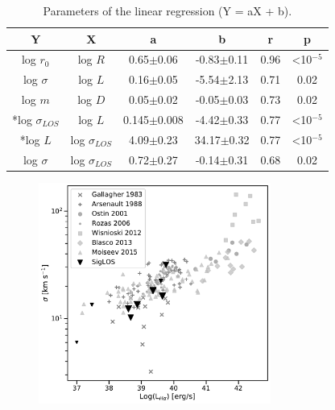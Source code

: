 \documentclass[fleqn,usenatbib, useAMS, a4paper]{mnras}
\begin{document}

\begin{table}
\begin{center}\caption{Parameters of the linear regression (Y = aX + b).}
\begin{tabular}{cccccc}\hline
Y                    &X         &a               &b                &r     & p                \\ \hline
log \(r_0\)          &log \(R\) &0.65\(\pm\)0.06 &-0.83\(\pm\)0.11 & 0.96 & <10\(^{-5}\)    \\ 
log \(\sigma\)       &log \(L\) &0.16\(\pm\)0.05 &-5.54\(\pm\)2.13 & 0.71 & 0.02             \\
log \(m\)            &log \(D\) &0.05\(\pm\)0.02 &-0.05\(\pm\)0.03 & 0.73 & 0.02  \\ 
*log \(\sigma_{LOS}\) &log \(L\) &0.145\(\pm\)0.008 &-4.42\(\pm\)0.33 & 0.77 & <10\(^{-5}\)  \\ 
*log \(L\) &log \(\sigma_{LOS}\) &4.09\(\pm\)0.23 &34.17\(\pm\)0.32 & 0.77 & <10\(^{-5}\)  \\ 
log \(\sigma\)       &log \(\sigma_{LOS}\) &0.72\(\pm\)0.27 &-0.14\(\pm\)0.31 &0.68 & 0.02 \\ \hline
\end{tabular}\label{tab:RestStats}
\end{center}
\end{table} 

\begin{figure}
\centering 
\includegraphics[width=3in]{Figures/lvss.pdf}
\caption{}
\label{fig:sigvsl}
\end{figure}
\end{document}
